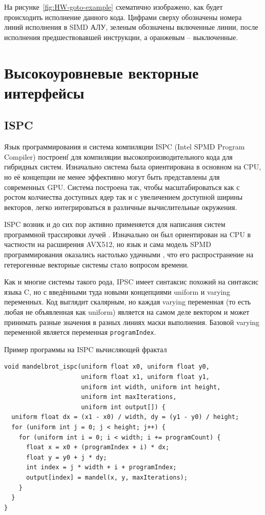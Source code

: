 На рисунке~\ref{fig:HW-goto-example} схематично изображено, как будет происходить исполнение данного кода. Цифрами сверху обозначены номера линий исполнения в SIMD АЛУ, зеленым обозначены включенные линии, после исполнения предшествовавшей инструкции, а оранжевым -- выключенные.

\section{Высокоуровневые векторные интерфейсы}\label{sec:overview/vectorapi}

\subsection{ISPC}\label{subsec:overview/vectorapi/ispc}

Язык программирования и система компиляции ISPC (Intel SPMD Program Compiler) построенf для компиляции высокопроизводительного кода для гибридных систем. Изначально система была ориентирована в основном на CPU, но её концепции не менее эффективно могут быть представлены для современных GPU. Система построена так, чтобы масштабироваться как с ростом колчиества доступных ядер так и с увеличением доступной ширины векторов, легко интегрироваться в различные вычислительные окружения.

ISPC возник и до сих пор активно применяется для написания систем программной трассировки лучей \cite{moreau2019dynamic}. Изначально он был ориентирован на CPU \cite{pharr2013ray} в частности на расширения AVX512, но язык и сама модель SPMD программирования оказались настолько удачными \cite{pharr2018guest}, что его распространение на гетерогенные векторные системы стало вопросом времени.

Как и многие системы такого рода, IPSC имеет синтаксис похожий на синтаксис языка C, но с введёнными туда новыми концепциями uniform и varying переменных. Код выглядит скалярным, но каждая varying переменная (то есть любая не объявленная как uniform) является на самом деле вектором и может принимать разные значения в разных линиях маски выполнения. Базовой varying переменной является переменная \lstinline!programIndex!.

\begin{ListingEnv}[!h]
    \captiondelim{ } 
    \caption{Пример программы на ISPC вычисляющей фрактал}\label{lst:ispcmandel}
    \begin{lstlisting}[language={[ISO]C++}]
void mandelbrot_ispc(uniform float x0, uniform float y0,
                     uniform float x1, uniform float y1,
                     uniform int width, uniform int height,
                     uniform int maxIterations,
                     uniform int output[]) {
  uniform float dx = (x1 - x0) / width, dy = (y1 - y0) / height;
  for (uniform int j = 0; j < height; j++) {
    for (uniform int i = 0; i < width; i += programCount) {
      float x = x0 + (programIndex + i) * dx;
      float y = y0 + j * dy;
      int index = j * width + i + programIndex;
      output[index] = mandel(x, y, maxIterations);
    }
  }
}
    \end{lstlisting}
\end{ListingEnv}

